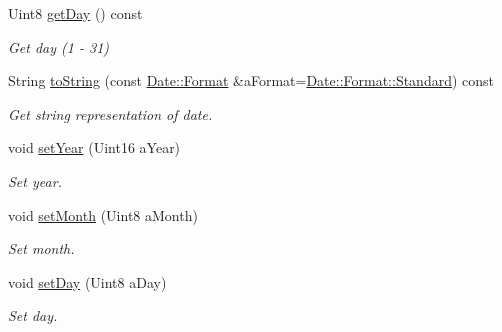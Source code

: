 \begin{DoxyCompactItemize}
Uint8 \hyperlink{classostk_1_1physics_1_1time_1_1_date_a8c8303a3934138bf18cebe4dd2430f83}{get\+Day} () const
\begin{DoxyCompactList}\small\item\em Get day (1 -\/ 31) \end{DoxyCompactList}\item 
String \hyperlink{classostk_1_1physics_1_1time_1_1_date_a633d86cf7c5baf4726b08a78fbc6dd47}{to\+String} (const \hyperlink{classostk_1_1physics_1_1time_1_1_date_a77a2e52ee3bcfd7c93139d2fe2c9a141}{Date\+::\+Format} \&a\+Format=\hyperlink{classostk_1_1physics_1_1time_1_1_date_a77a2e52ee3bcfd7c93139d2fe2c9a141aeb6d8ae6f20283755b339c0dc273988b}{Date\+::\+Format\+::\+Standard}) const
\begin{DoxyCompactList}\small\item\em Get string representation of date. \end{DoxyCompactList}\item 
void \hyperlink{classostk_1_1physics_1_1time_1_1_date_a86b990462a6e3a79211b7a3c888ade04}{set\+Year} (Uint16 a\+Year)
\begin{DoxyCompactList}\small\item\em Set year. \end{DoxyCompactList}\item 
void \hyperlink{classostk_1_1physics_1_1time_1_1_date_a40a08deb839e23115ef4ca822497dd9b}{set\+Month} (Uint8 a\+Month)
\begin{DoxyCompactList}\small\item\em Set month. \end{DoxyCompactList}\item 
void \hyperlink{classostk_1_1physics_1_1time_1_1_date_aa4e71082fc602b1a1e5740e9db04b071}{set\+Day} (Uint8 a\+Day)
\begin{DoxyCompactList}\small\item\em Set day. \end{DoxyCompactList}\end{DoxyCompactItemize}
